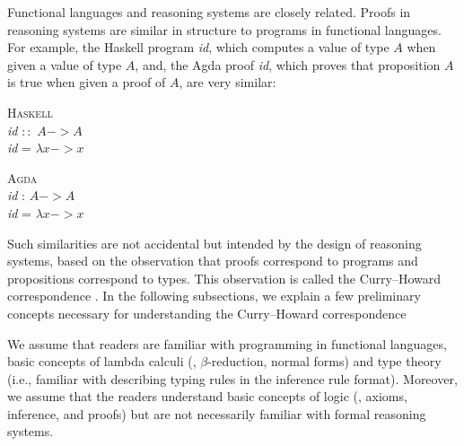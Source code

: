 Functional languages and reasoning systems are closely related.
Proofs in reasoning systems are similar in structure to programs
in functional languages. For example, the Haskell program \textit{id},
which computes a value of type $A$ when given a value of type $A$,
and, the Agda proof \textit{id}, which proves that proposition $A$
is true when given a proof of $A$, are very similar:
\begin{center}
\begin{singlespace}
\begin{minipage}{.4\linewidth}
        \textsc{Haskell} \vspace*{.5em} \\
\textit{id} $::$ $A -> A$ \\
\textit{id} = $\lambda x -> x$
\end{minipage}
\begin{minipage}{.4\linewidth}
        \textsc{Agda}  \vspace*{.5em} \\
\textit{id} : $A -> A$ \\
\textit{id} = $\lambda x -> x$
\end{minipage}
\end{singlespace}
\end{center}\vspace*{.5em}
Such similarities are not accidental but intended by the design of
reasoning systems, based on the observation that proofs correspond to
programs and propositions correspond to types. This observation
is called the Curry--Howard correspondence \cite{Howard69}.
In the following subsections, we explain a few preliminary concepts
necessary for understanding the Curry--Howard correspondence

We assume that readers are familiar with programming
in functional languages, basic concepts of lambda calculi
(\eg, $\beta$-reduction, normal forms) and type theory
(i.e., familiar with describing typing rules in the inference rule format).
Moreover, we assume that the readers understand basic concepts of logic
(\eg, axioms, inference, and proofs) but are not necessarily familiar with
formal reasoning systems.

